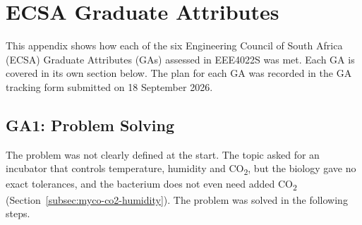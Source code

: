 \chapter{ECSA Graduate Attributes}
\label{app:ga}

This appendix shows how each of the six Engineering Council of South Africa (ECSA) Graduate Attributes (GAs) assessed in EEE4022S was met. Each GA is covered in its own section below. The plan for each GA was recorded in the GA tracking form submitted on 18 September 2026.

\section{GA1: Problem Solving}
\label{app:ga1}

The problem was not clearly defined at the start. The topic asked for an incubator that controls temperature, humidity and CO\textsubscript{2}, but the biology gave no exact tolerances, and the bacterium does not even need added CO\textsubscript{2} (Section~\ref{subsec:myco-co2-humidity}). The problem was solved in the following steps.

